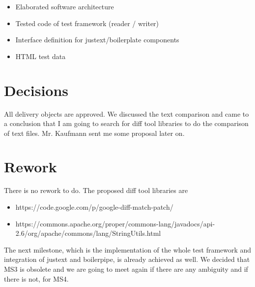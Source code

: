 \begin{itemize}
\item Elaborated software architecture
\item Tested code of test framework (reader / writer)
\item Interface definition for justext/boilerplate components
\item HTML test data
\end{itemize}


\section{Decisions}

All delivery objects are approved. We discussed the text comparison and came to a conclusion that I am going to search for diff tool libraries to do the comparison of text files. Mr. Kaufmann sent me some proposal later on.


\section{Rework}

There is no rework to do.
The proposed diff tool libraries are

\begin{itemize}
\item https://code.google.com/p/google-diff-match-patch/
\item https://commons.apache.org/proper/commons-lang/javadocs/api-2.6/org/apache/commons/lang/StringUtils.html
\end{itemize}


The next milestone, which is the implementation of the whole test framework and integration of justext and boilerpipe, is already achieved as well. We decided that MS3 is obsolete and we are going to meet again if there are any ambiguity and if there is not, for MS4.






